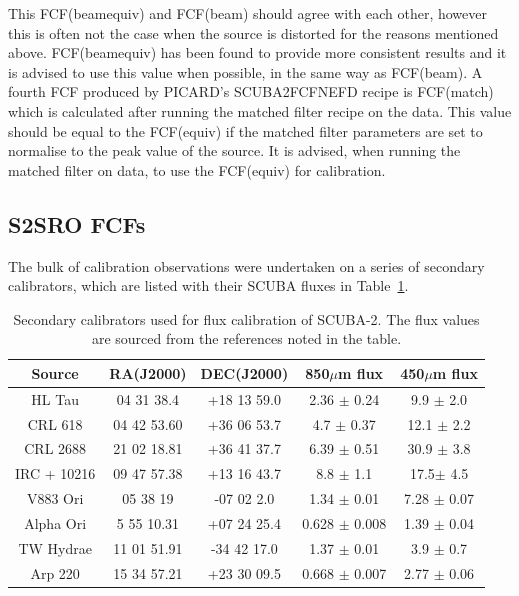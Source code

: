 \documentclass[twoside,11pt]{article}
\renewcommand{\_}{\texttt{\symbol{95}}}
\begin{document}
\begin{itemize}
This FCF(beamequiv) and FCF(beam) should agree with each other,
however this is often not the case when the source is distorted for
the reasons mentioned above. FCF(beamequiv) has been found to provide
more consistent results and it is advised to use this value when
possible, in the same way as FCF(beam). A fourth FCF produced by
PICARD's SCUBA2\_FCFNEFD recipe is FCF(match) which is calculated
after running the matched filter recipe on the data. This value should
be equal to the FCF(equiv) if the matched filter parameters are set to
normalise to the peak value of the source. It is advised, when running
the matched filter on data, to use the FCF(equiv) for calibration.

\end{itemize}

\subsection{S2SRO FCFs}

The bulk of calibration observations were undertaken on a series of
secondary calibrators, which are listed with their SCUBA fluxes in
Table~\ref{tab1}.

\begin{table}[h]
\caption{Secondary calibrators used for flux calibration of SCUBA-2. The flux values are sourced from the references noted in the table. }
\label{tab1}
\begin{center}
\begin{tabular}{|c|c|c|c|c|}

\hline
\rule[-1ex]{0pt}{3.5ex} Source & RA(J2000) & DEC(J2000) & 850$\mu$m flux & 450$\mu$m flux  \\
\hline
\rule[-1ex]{0pt}{3.5ex} HL Tau & 04 31 38.4 & +18 13 59.0 & 2.36 $\pm$ 0.24\cite{flux1}  & 9.9 $\pm$ 2.0\cite{flux1}\\
\hline
\rule[-1ex]{0pt}{3.5ex} CRL 618	& 04 42 53.60 & +36 06 53.7 & 4.7  $\pm$ 0.37\cite{flux1}  & 12.1 $\pm$ 2.2\cite{flux1} \\
\hline
\rule[-1ex]{0pt}{3.5ex} CRL 2688 & 21 02 18.81 & +36 41 37.7 & 6.39  $\pm$ 0.51\cite{flux1}  & 30.9 $\pm$ 3.8\cite{flux1} \\
\hline
\rule[-1ex]{0pt}{3.5ex} IRC + 10216 & 09 47 57.38 & +13 16 43.7 & 8.8  $\pm$ 1.1\cite{flux1}   & 17.5$\pm$ 4.5\cite{flux1} \\
\hline
\rule[-1ex]{0pt}{3.5ex} V883 Ori &  05 38 19  & -07 02 2.0 & 1.34 $\pm$ 0.01\cite{flux2}  & 7.28 $\pm$ 0.07\cite{flux2}   \\
\hline
\rule[-1ex]{0pt}{3.5ex} Alpha Ori & 5 55 10.31 & +07 24 25.4 & 0.628 $\pm$ 0.008\cite{flux2}  & 1.39 $\pm$ 0.04\cite{flux2}  \\
\hline
\rule[-1ex]{0pt}{3.5ex} TW Hydrae & 11 01 51.91 & -34 42 17.0 & 1.37 $\pm$ 0.01\cite{flux2}  & 3.9 $\pm$ 0.7\cite{flux2}  \\
\hline
\rule[-1ex]{0pt}{3.5ex} Arp 220 & 15 34 57.21 & +23 30 09.5 & 0.668 $\pm$ 0.007\cite{flux2}  & 2.77 $\pm$ 0.06\cite{flux2} \\
\hline

\end{tabular}
\end{center}
\end{table}
\end{document}
